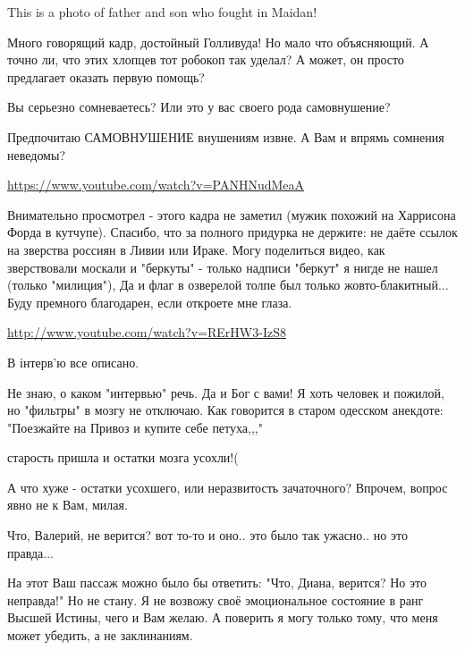 This is a photo of father and son who fought in Maidan!


Много говорящий кадр, достойный Голливуда! Но мало что объясняющий. А точно ли,
что этих хлопцев тот робокоп так уделал? А может, он просто предлагает оказать
первую помощь?

\begin{itemize} %
Вы серьезно сомневаетесь? Или это у вас своего рода самовнушение?

Предпочитаю САМОВНУШЕНИЕ внушениям извне. А Вам и впрямь сомнения неведомы?

\url{https://www.youtube.com/watch?v=PANHNudMeaA}


Внимательно просмотрел - этого кадра не заметил (мужик похожий на Харрисона
Форда в кутчупе). Спасибо, что за полного придурка не держите: не даёте ссылок
на зверства россиян в Ливии или Ираке. Могу поделиться видео, как зверствовали
москали и "беркуты" - только надписи "беркут" я нигде не нашел (только
"милиция"), Да и флаг в озверелой толпе был только жовто-блакитный... Буду
премного благодарен, если откроете мне глаза.

\url{http://www.youtube.com/watch?v=RErHW3-IzS8}

В інтерв'ю все описано.


Не знаю, о каком "интервью" речь. Да и Бог с вами! Я хоть человек и пожилой, но
"фильтры" в мозгу не отключаю. Как говорится в старом одесском анекдоте:
"Поезжайте на Привоз и купите себе петуха,,,"

старость пришла и остатки мозга усохли!(

А что хуже - остатки усохшего, или неразвитость зачаточного? Впрочем, вопрос явно не к Вам, милая.

Что, Валерий, не верится? вот то-то и оно.. это было так ужасно.. но это правда...


На этот Ваш пассаж можно было бы ответить: "Что, Диана, верится? Но это
неправда!" Но не стану. Я не возвожу своё эмоциональное состояние в ранг Высшей
Истины, чего и Вам желаю. А поверить я могу только тому, что меня может
убедить, а не заклинаниям.


\end{itemize}
